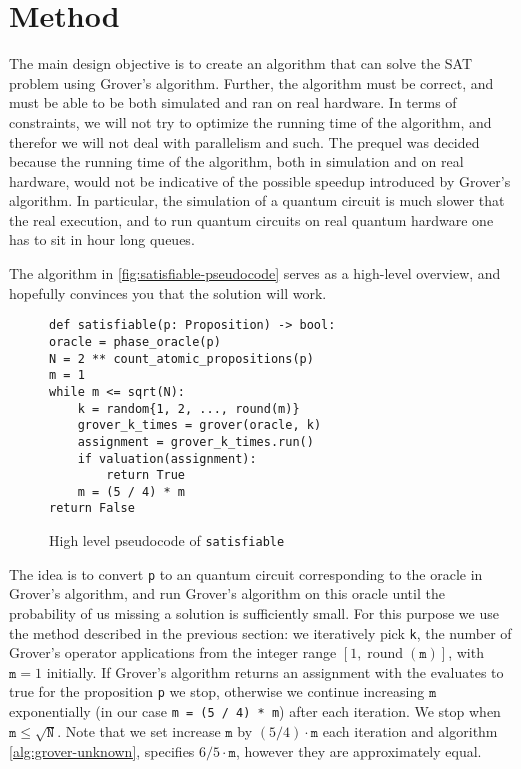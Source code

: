 \section{Method}\label{sec:method}

The main design objective is to create an algorithm that can solve the SAT problem using Grover's algorithm.
Further, the algorithm must be correct, and must be able to be both simulated and ran on real hardware.
In terms of constraints, we will not try to optimize the running time of the algorithm, and therefor we will not deal with parallelism and such.
The prequel was decided because the running time of the algorithm, both in simulation and on real hardware, would not be indicative of the possible speedup introduced by Grover's algorithm.
In particular, the simulation of a quantum circuit is much slower that the real execution, and to run quantum circuits on real quantum hardware one has to sit in hour long queues.

The algorithm in \autoref{fig:satisfiable-pseudocode} serves as a high-level overview, and hopefully convinces you that the solution will work.

\begin{figure}
\centering
\begin{verbatim}
def satisfiable(p: Proposition) -> bool:
oracle = phase_oracle(p)
N = 2 ** count_atomic_propositions(p)
m = 1
while m <= sqrt(N):
    k = random{1, 2, ..., round(m)}
    grover_k_times = grover(oracle, k)
    assignment = grover_k_times.run()
    if valuation(assignment):
        return True
    m = (5 / 4) * m
return False
\end{verbatim}
\caption{High level pseudocode of \texttt{satisfiable} }
\label{fig:satisfiable-pseudocode}
\end{figure}

The idea is to convert \texttt{p} to an quantum circuit corresponding to the oracle in Grover's algorithm, and run Grover's algorithm  on this oracle until the probability of us missing a solution is sufficiently small.
For this purpose we use the method described in the previous section:
we iteratively pick \texttt{k}, the number of Grover's operator applications from the integer range $[1, \operatorname{round}(\texttt{m})]$, with $\texttt{m} = 1$ initially.
If Grover's algorithm returns an assignment with the evaluates to true for the proposition \texttt{p} we stop, otherwise we continue increasing $\texttt{m}$ exponentially (in our case \texttt{m = (5 / 4) * m}) after each iteration.
We stop when $\texttt{m} \leq \sqrt{\texttt{N}}$.
Note that we set increase $\texttt{m}$ by $(5 / 4) \cdot \texttt{m}$ each iteration and algorithm \ref{alg:grover-unknown}, specifies $6/5 \cdot \texttt{m}$, however they are approximately equal.
